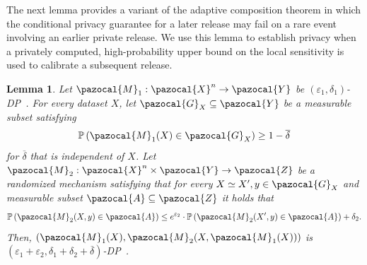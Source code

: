 \documentclass[11pt]{article}
\newtheorem{lem}{Lemma}
\theoremstyle{definition}
\theoremstyle{plain}
\newcommand{\eps}{{\varepsilon}}
\newcommand{\pA}{\pazocal{A}}
\newcommand{\pG}{\pazocal{G}}
\newcommand{\pM}{\pazocal{M}}
\newcommand{\pX}{\pazocal{X}}
\newcommand{\pY}{\pazocal{Y}}
\newcommand{\pZ}{\pazocal{Z}}
\newcommand{\DP}{{\normalfont DP}~}
\renewcommand{\eps}{\varepsilon}
\begin{document}
\bigskip 
The next lemma provides a variant of the adaptive composition theorem in which the conditional privacy guarantee for a later release may fail on a rare event involving an earlier private release. We use this lemma to establish privacy when a privately computed, high-probability upper bound on the local sensitivity is used to calibrate a subsequent release.
\begin{lem}
    \label{lem:privacy_rare_event_adaptive_composition}
    Let $\pM_1: \pX^{n} \to \pY$ be $(\eps_1, \delta_1)$-\DP. For every dataset $X$, let $\pG_{X} \subseteq \pY$ be a measurable subset satisfying 
    \begin{align}
        \label{eq:bad_event_pm_1}
        \mathbb{P}\left(\pM_1(X)\in \pG_{X}\right) \geq 1 - \overline{\delta}
    \end{align}
    for $\overline{\delta}$ that is independent of $X$. Let $\pM_2: \pX^{n}\times \pY \to \pZ$ be a randomized mechanism satisfying that for every $X\simeq X', y\in \pG_{X}$ and measurable subset $\pA\subseteq \pZ$ it holds that 
    \begin{align}
        \label{eq:second_mechanism_dp}
        \mathbb{P}\left(\pM_2(X, y) \in \pA\right) \leq e^{\eps_2}\cdot \mathbb{P}\left(\pM_2(X', y) \in \pA\right) + \delta_2.
    \end{align}
    Then, $\left(\pM_1(X), \pM_2(X, \pM_1(X))\right)$ is $\left(\eps_1+\eps_2, \delta_1 + \delta_2 + \overline{\delta}\right)$-\DP.
\end{lem}
\end{document}
